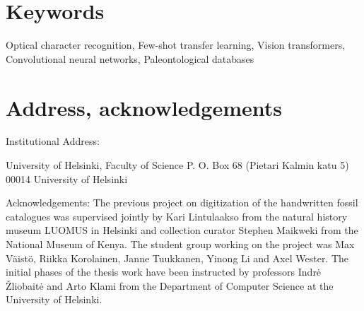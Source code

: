 \documentclass{article}
\begin{document}

\section{Keywords}
Optical character recognition,
Few-shot transfer learning,
Vision transformers,
Convolutional neural networks,
Paleontological databases

\section{Address, acknowledgements}
Institutional Address:

University of Helsinki, Faculty of Science
P. O. Box 68 (Pietari Kalmin katu 5)
00014 University of Helsinki

Acknowledgements: The previous project on digitization of 
the handwritten fossil catalogues was supervised jointly by Kari Lintulaakso from the natural history museum LUOMUS 
in Helsinki and collection curator Stephen Maikweki from the National Museum of Kenya.
The student group working on the project was Max Väistö, Riikka Korolainen, Janne Tuukkanen, Yinong Li and Axel Wester.
The initial phases of the thesis work have been instructed by professors Indrė Žliobaitė and Arto Klami from the Department 
of Computer Science at the University of Helsinki.
\end{document}
